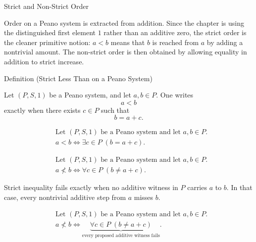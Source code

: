 \begin{topicbox}{Strict and Non-Strict Order}
\begin{exposition}
Order on a Peano system is extracted from addition. Since the chapter is using
the distinguished first element $1$ rather than an additive zero, the strict
order is the cleaner primitive notion: $a<b$ means that $b$ is reached from
$a$ by adding a nontrivial amount. The non-strict order is then obtained by
allowing equality in addition to strict increase.
\end{exposition}

\begin{definitionbox}{Definition (Strict Less Than on a Peano System)}
\begin{definition}
\label{def:strict-less-than-on-peano-system}
Let $(P,S,1)$ be a Peano system, and let $a,b \in P$. One writes
\[
a<b
\]
exactly when there exists $c \in P$ such that
\[
b=a+c.
\]
\end{definition}
\end{definitionbox}

\begin{remark*}
\[
\begin{aligned}
&\text{Let } (P,S,1) \text{ be a Peano system and let } a,b \in P.\\
&a<b
\Longleftrightarrow
\exists c \in P\;(b=a+c).
\end{aligned}
\]
\end{remark*}

\begin{remark*}
\[
\begin{aligned}
&\text{Let } (P,S,1) \text{ be a Peano system and let } a,b \in P.\\
&a \not< b
\Longleftrightarrow
\forall c \in P\;(b \neq a+c).
\end{aligned}
\]
\end{remark*}

\begin{remark*}
Strict inequality fails exactly when no additive witness in $P$ carries $a$ to
$b$. In that case, every nontrivial additive step from $a$ misses $b$.
\end{remark*}

\begin{remark*}
\[
\begin{aligned}
&\text{Let } (P,S,1) \text{ be a Peano system and let } a,b \in P.\\
&a \not< b
\Longleftrightarrow
\underbrace{\forall c \in P\;(b \neq a+c)}_{\text{every proposed additive witness fails}}.
\end{aligned}
\]
\end{remark*}


\end{topicbox}
